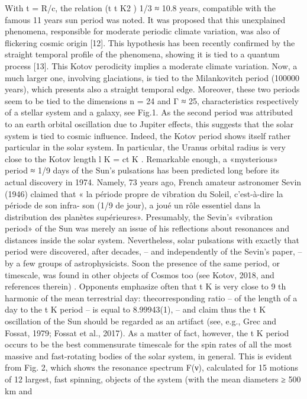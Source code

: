 With t = R/c, the relation (t t K2 ) 1/3 ≈ 10.8 years, compatible with the famous 11 years sun period
was noted. It was proposed that this unexplained phenomena, responsible for moderate periodic
climate variation, was also of flickering cosmic origin [12]. This hypothesis has been recently
confirmed by the straight temporal profile of the phenomena, showing it is tied to a quantum
process [13].
This Kotov perodicity implies a moderate climate variation. Now, a much larger one, involving
glaciations, is tied to the Milankovitch period (100000 years), which presents also a straight
temporal edge. Moreover, these two periods seem to be tied to the dimensions n = 24 and Γ ≈ 25,
characteristics respectively of a stellar system and a galaxy, see Fig.1. As the second period was
attributed to an earth orbital oscillation due to Jupiter effects, this suggests that the solar system is
tied to cosmic influence. Indeed, the Kotov period shows itself rather particular in the solar system.
In particular, the Uranus orbital radius is very close to the Kotov length l K = ct K .
Remarkable enough, a «mysterious» period ≈ 1/9 days of the Sun's pulsations has been predicted
long before its actual discovery in 1974. Namely, 73 years ago, French amateur astronomer Sevin
(1946) claimed that « la période propre de vibration du Soleil, c'est-à-dire la période de son infra-
son (1/9 de jour), a joué un rôle essentiel dans la distribution des planètes supérieures». Presumably,
the Sevin's «vibration period» of the Sun was merely an issue of his reflections about resonances
and distances inside the solar system. Nevertheless, solar pulsations with exactly that period were
discovered, after decades, – and independently of the Sevin's paper, – by a few groups of
astrophysicists. Soon the presence of the same period, or timescale, was found in other objects of
Cosmos too (see Kotov, 2018, and references therein) .
Opponents emphasize often that t K is very close to 9 th harmonic of the mean terrestrial day: thecorresponding ratio – of the length of a day to the t K period – is equal to 8.99943(1), – and claim
thus the t K oscillation of the Sun should be regarded as an artifact (see, e.g., Grec and Fossat, 1979;
Fossat et al., 2017). As a matter of fact, however, the t K period occurs to be the best commensurate
timescale for the spin rates of all the most massive and fast-rotating bodies of the solar system, in
general.
This is evident from Fig. 2, which shows the resonance spectrum F(ν), calculated for 15
motions of 12 largest, fast spinning, objects of the system (with the mean diameters ≥ 500 km and
